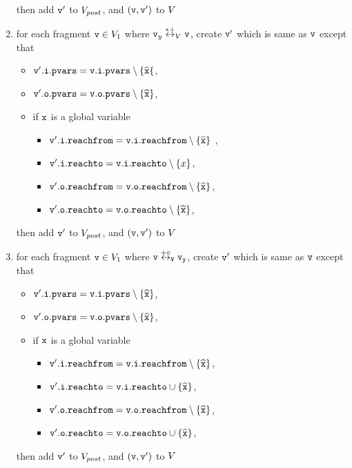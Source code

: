 \begin{enumerate}
\begin{itemize}
\begin{itemize}
\end{itemize}
\end{itemize}
then add $\mathtt{v}'$ to $V_{post}$, and $(\mathtt{v},\mathtt{v}')$ to $V$
\item for each fragment $\mathtt{v} \in V_1$ where $\mathtt{v}_y \overset{*+}\leftrightarrow_{V} \mathtt{v}$, create $\mathtt{v}'$ which is same as $\mathtt{v}$ except that 
\begin{itemize}
\item $\mathtt{v}'.\mathtt{i}.\mathtt{pvars} = \mathtt{v}.\mathtt{i}.\mathtt{pvars} \setminus \{\widehat{\mathtt{x}}\{$,
\item $\mathtt{v}'.\mathtt{o}.\mathtt{pvars} = \mathtt{v}.\mathtt{o}.\mathtt{pvars} \setminus \left\{\widehat{\mathtt{x}}\right\}$,
\item if $\tt x$ is a global variable
\begin{itemize}
\item $\mathtt{v}'.\mathtt{i}.\mathtt{reachfrom} = \mathtt{v}.\mathtt{i}.\mathtt{reachfrom} \setminus \left\{\widehat{\mathtt{x}}\right\}$ ,
\item $\mathtt{v}'.\mathtt{i}.\mathtt{reachto} = \mathtt{v}.\mathtt{i}.\mathtt{reachto} \setminus \left\{x\right\}$,
\item $\mathtt{v}'.\mathtt{o}.\mathtt{reachfrom} = \mathtt{v}.\mathtt{o}.\mathtt{reachfrom} \setminus \left\{\widehat{\mathtt{x}}\right\}$,
\item $\mathtt{v}'.\mathtt{o}.\mathtt{reachto} = \mathtt{v}.\mathtt{o}.\mathtt{reachto} \setminus \left\{\widehat{\mathtt{x}}\right\}$,
\end{itemize}
\end{itemize}
then add $\mathtt{v}'$ to $V_{post}$, and $(\mathtt{v},\mathtt{v}')$ to $V$
\item for each fragment $\mathtt{v} \in V_1$ where $\tt v \overset{+\circ}\leftrightarrow_{V} \mathtt{v}_y$, create $\mathtt{v}'$ which is same as $\mathtt{v}$ except that 
\begin{itemize}
\item $\mathtt{v}'.\mathtt{i}.\mathtt{pvars} = \mathtt{v}.\mathtt{i}.\mathtt{pvars} \setminus \left\{\widehat{\mathtt{x}}\right\}$,
\item $\mathtt{v}'.\mathtt{o}.\mathtt{pvars} = \mathtt{v}.\mathtt{o}.\mathtt{pvars} \setminus \left\{\widehat{\mathtt{x}}\right\}$,
\item if $\tt x$ is a global variable
\begin{itemize}
\item $\mathtt{v}'.\mathtt{i}.\mathtt{reachfrom} = \mathtt{v}.\mathtt{i}.\mathtt{reachfrom} \setminus \left\{\widehat{\mathtt{x}}\right\}$,
\item $\mathtt{v}'.\mathtt{i}.\mathtt{reachto} = \mathtt{v}.\mathtt{i}.\mathtt{reachto} \cup \left\{\widehat{\mathtt{x}}\right\}$,
 \item $\mathtt{v}'.\mathtt{o}.\mathtt{reachfrom} = \mathtt{v}.\mathtt{o}.\mathtt{reachfrom} \setminus \left\{\widehat{\mathtt{x}}\right\}$,
 \item $\mathtt{v}'.\mathtt{o}.\mathtt{reachto} = \mathtt{v}.\mathtt{o}.\mathtt{reachto} \cup \left\{\widehat{\mathtt{x}}\right\}$,
\end{itemize}
\end{itemize}
then add $\mathtt{v}'$ to $V_{post}$, and $(\mathtt{v},\mathtt{v}')$ to $V$


\end{enumerate}
